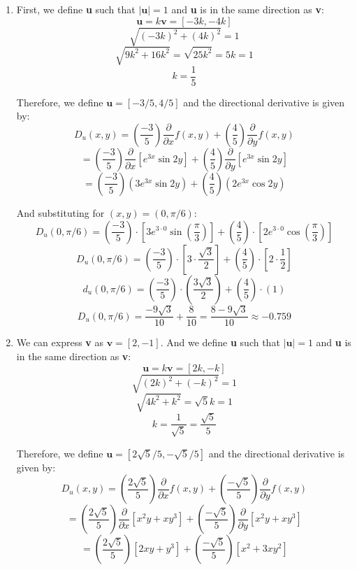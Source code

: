\begin{Answer}[ref = direction]
\begin{enumerate}
    \item First, we define \textbf{u} such that $|\textbf{u}| = 1$ and 
    \textbf{u} is in the same direction as \textbf{v}:
    $$\textbf{u} = k \textbf{v} = \left[ -3k, -4k \right]$$
    $$\sqrt{ \left( -3k \right)^2 + \left( 4k \right)^2} = 1$$
    $$\sqrt{9k^2 + 16k^2} = \sqrt{25k^2} = 5k = 1$$
    $$k = \frac{1}{5}$$

    Therefore, we define $\textbf{u} = \left[ -3/5, 4/5 \right]$ and the 
    directional derivative is given by:
    $$D_u(x, y) = \left( \frac{-3}{5} \right) \frac{\partial}{\partial x} f(x, 
    y) + \left( \frac{4}{5} \right) \frac{\partial}{\partial y} f(x, y)$$
    $$= \left( \frac{-3}{5} \right) \frac{\partial}{\partial x} \left[ e^{3x} 
    \sin{2y} \right] + \left( \frac{4}{5} \right) \frac{\partial}{\partial y} 
    \left[ e^{3x} \sin{2y} \right]$$
    $$= \left( \frac{-3}{5} \right) \left( 3e^{3x} \sin{2y} \right) + \left( 
    \frac{4}{5} \right) \left( 2e^{3x} \cos{2y} \right)$$

    And substituting for $(x, y) = (0, \pi/6)$:
    $$D_u(0, \pi/6) = \left( \frac{-3}{5} \right) \cdot \left[ 3e^{3 \cdot 0} 
    \sin{ \left( \frac{\pi}{3} \right)} \right] + \left( \frac{4}{5} \right) 
    \cdot \left[ 2e^{3 \cdot 0} \cos{ \left( \frac{\pi}{3} \right)} \right]$$
    $$D_u(0, \pi/6) = \left( \frac{-3}{5} \right) \cdot \left[ 3 \cdot \frac{
    \sqrt{3}}{2} \right] + \left( \frac{4}{5} \right) \cdot \left[ 2 \cdot 
    \frac{1}{2} \right]$$
    $$d_u(0, \pi/6) = \left( \frac{-3}{5} \right) \cdot \left( \frac{3
    \sqrt{3}}{2} \right) + \left( \frac{4}{5} \right) \cdot \left( 1 \right)$$
    $$D_u(0, \pi/6) = \frac{-9\sqrt{3}}{10} + \frac{8}{10} = \frac{8-9\sqrt{3}
    }{10} \approx -0.759$$

    \item We can express \textbf{v} as $\textbf{v} = \left[ 2, -1 \right]$. 
    And we define \textbf{u} such that $| \textbf{u} | = 1$ and \textbf{u} is 
    in the same direction as \textbf{v}:
    $$\textbf{u} = k\textbf{v} = \left[ 2k, -k \right]$$
    $$\sqrt{\left( 2k \right)^2 + \left( -k \right)^2} = 1$$
    $$\sqrt{4k^2 + k^2} = \sqrt{5}k = 1$$
    $$k = \frac{1}{\sqrt{5}} = \frac{\sqrt{5}}{5}$$

    Therefore, we define $\textbf{u} = \left[ 2\sqrt{5}/5, -\sqrt{5}/5 \right]$
    and the directional derivative is given by:
    $$D_u(x, y) = \left( \frac{2\sqrt{5}}{5} \right) \frac{\partial}{\partial 
    x}f(x, y) + \left( \frac{-\sqrt{5}}{5} \right) \frac{\partial}{\partial y}
    f(x, y)$$
    $$= \left( \frac{2\sqrt{5}}{5} \right) \frac{\partial}{\partial x} \left[ 
    x^2y + xy^3 \right] + \left( \frac{-\sqrt{5}}{5} \right) \frac{\partial}{
    \partial y} \left[ x^2y + xy^3 \right]$$
    $$= \left( \frac{2\sqrt{5}}{5} \right) \left[ 2xy + y^3 \right] + \left( 
    \frac{-\sqrt{5}}{5} \right) \left[ x^2 + 3xy^2 \right]$$


\end{enumerate}
\end{Answer}
